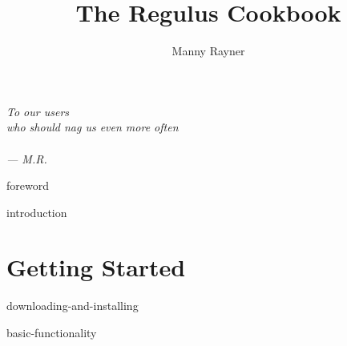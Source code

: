 \documentclass{book}
\title{The Regulus Cookbook}                     %
\author{Manny Rayner}
\begin{document}
\lstset{language=Prolog,basicstyle=\small\bfseries\ttfamily,breakindent=10pt, breaklines} %
 


\frontmatter      %


\maketitle                %

\thispagestyle{empty}
\newenvironment{dedication}
  {\cleardoublepage \thispagestyle{empty} \vspace*{\stretch{1}} \begin{center} \em}
  {\end{center} \vspace*{\stretch{3}} \clearpage}
\begin{dedication}
{\large
To our users\\
who should nag us even more often\\
~\\
--- M.R.
}
\end{dedication}
\thispagestyle{empty} \cleardoublepage

\setcounter{page}{7}
\setcounter{tocdepth}{1}  %
\tableofcontents          %

 {foreword}   %


\mainmatter       %


 {introduction}

\part{Getting Started}

 {downloading-and-installing}

 {basic-functionality}
\end{document}

